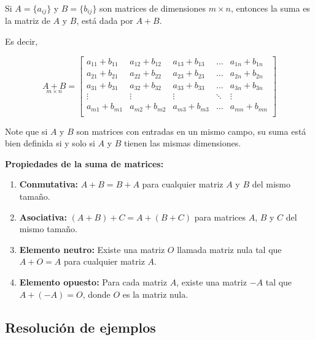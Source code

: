 \begin{definition} Si $A = \{a_{ij}\}$ y $B = \{b_{ij}\}$ son matrices de dimensiones $m\times n$, entonces la suma es la matriz de $A$ y $B$, está dada por $A+B$.  
\end{definition}
Es decir, 

$$
\underset{m \times n}{A+B}=\begin{bmatrix}
    a_{11}+b_{11} & a_{12}+b_{12} & a_{13}+b_{13} & \dots & a_{1n}+b_{1n} \\
    a_{21}+b_{21} & a_{22}+b_{22} & a_{23}+b_{23} & \dots & a_{2n}+b_{2n} \\
    a_{31}+b_{31} & a_{32}+b_{32} & a_{33}+b_{33} & \dots & a_{3n}+b_{3n} \\
    \vdots & \vdots & \vdots & \ddots & \vdots \\
    a_{m1}+b_{m1} & a_{m2}+b_{m2} & a_{m3}+b_{m3} & \dots & a_{mn}+b_{mn} \\
  \end{bmatrix}
$$

\begin{remark}
Note que si \( A \) y \( B \) son matrices con entradas en un mismo campo, su suma está bien definida si y solo si \( A \) y \( B \) tienen las mismas dimensiones.
    
\end{remark}
\textbf{Propiedades de la suma de matrices:}

\begin{enumerate}
    \item \textbf{Conmutativa:} \( A + B = B + A \) para cualquier matriz \( A \) y \( B \) del mismo tamaño.
    
    \item \textbf{Asociativa:} \( (A + B) + C = A + (B + C) \) para matrices \( A \), \( B \) y \( C \) del mismo tamaño.
    
    \item \textbf{Elemento neutro:} Existe una matriz \( O \) llamada matriz nula tal que \( A + O = A \) para cualquier matriz \( A \).
    
    \item \textbf{Elemento opuesto:} Para cada matriz \( A \), existe una matriz \( -A \) tal que \( A + (-A) = O \), donde \( O \) es la matriz nula.
\end{enumerate}



\subsection{Resolución de ejemplos}

